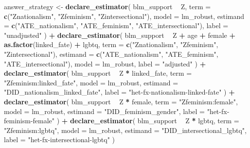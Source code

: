 \documentclass[
]{article}
\newenvironment{Shaded}{\begin{snugshade}}{\end{snugshade}}
\newcommand{\DataTypeTok}[1]{\textcolor[rgb]{0.13,0.29,0.53}{#1}}
\newcommand{\KeywordTok}[1]{\textcolor[rgb]{0.13,0.29,0.53}{\textbf{#1}}}
\newcommand{\NormalTok}[1]{#1}
\newcommand{\OperatorTok}[1]{\textcolor[rgb]{0.81,0.36,0.00}{\textbf{#1}}}
\newcommand{\StringTok}[1]{\textcolor[rgb]{0.31,0.60,0.02}{#1}}
\begin{document}
\begin{Shaded}
\begin{Highlighting}[]
\NormalTok{answer_strategy <-}
\StringTok{  }\KeywordTok{declare_estimator}\NormalTok{(}
\NormalTok{    blm_support }\OperatorTok{~}\StringTok{ }\NormalTok{Z,}
    \DataTypeTok{term =} \KeywordTok{c}\NormalTok{(}\StringTok{"Znationalism"}\NormalTok{, }\StringTok{"Zfeminism"}\NormalTok{, }\StringTok{"Zintersectional"}\NormalTok{),}
    \DataTypeTok{model =}\NormalTok{ lm_robust,}
    \DataTypeTok{estimand =} \KeywordTok{c}\NormalTok{(}\StringTok{"ATE_nationalism"}\NormalTok{, }\StringTok{"ATE_feminism"}\NormalTok{, }\StringTok{"ATE_intersectional"}\NormalTok{),}
    \DataTypeTok{label =} \StringTok{"unadjusted"}
\NormalTok{  ) }\OperatorTok{+}
\StringTok{  }\KeywordTok{declare_estimator}\NormalTok{(}
\NormalTok{    blm_support }\OperatorTok{~}\StringTok{ }\NormalTok{Z }\OperatorTok{+}\StringTok{ }\NormalTok{age }\OperatorTok{+}\StringTok{ }\NormalTok{female }\OperatorTok{+}\StringTok{ }\KeywordTok{as.factor}\NormalTok{(linked_fate) }\OperatorTok{+}\StringTok{ }\NormalTok{lgbtq,}
    \DataTypeTok{term =} \KeywordTok{c}\NormalTok{(}\StringTok{"Znationalism"}\NormalTok{, }\StringTok{"Zfeminism"}\NormalTok{, }\StringTok{"Zintersectional"}\NormalTok{),}
    \DataTypeTok{estimand =} \KeywordTok{c}\NormalTok{(}\StringTok{"ATE_nationalism"}\NormalTok{, }\StringTok{"ATE_feminism"}\NormalTok{, }\StringTok{"ATE_intersectional"}\NormalTok{),}
    \DataTypeTok{model =}\NormalTok{ lm_robust,}
    \DataTypeTok{label =} \StringTok{"adjusted"}
\NormalTok{  ) }\OperatorTok{+}
\StringTok{  }\KeywordTok{declare_estimator}\NormalTok{(}
\NormalTok{    blm_support }\OperatorTok{~}\StringTok{ }\NormalTok{Z }\OperatorTok{*}\StringTok{ }\NormalTok{linked_fate,}
    \DataTypeTok{term =} \StringTok{"Zfeminism:linked_fate"}\NormalTok{,}
    \DataTypeTok{model =}\NormalTok{ lm_robust,}
    \DataTypeTok{estimand =} \StringTok{"DID_nationalism_linked_fate"}\NormalTok{,}
    \DataTypeTok{label =} \StringTok{"het-fx-nationalism-linked-fate"}
\NormalTok{  ) }\OperatorTok{+}
\StringTok{  }\KeywordTok{declare_estimator}\NormalTok{(}
\NormalTok{    blm_support }\OperatorTok{~}\StringTok{ }\NormalTok{Z }\OperatorTok{*}\StringTok{ }\NormalTok{female,}
    \DataTypeTok{term =} \StringTok{"Zfeminism:female"}\NormalTok{,}
    \DataTypeTok{model =}\NormalTok{ lm_robust,}
    \DataTypeTok{estimand =} \StringTok{"DID_feminism_gender"}\NormalTok{,}
    \DataTypeTok{label =} \StringTok{"het-fx-feminism-female"}
\NormalTok{  ) }\OperatorTok{+}
\StringTok{  }\KeywordTok{declare_estimator}\NormalTok{(}
\NormalTok{    blm_support }\OperatorTok{~}\StringTok{ }\NormalTok{Z }\OperatorTok{*}\StringTok{ }\NormalTok{lgbtq,}
    \DataTypeTok{term =} \StringTok{"Zfeminism:lgbtq"}\NormalTok{,}
    \DataTypeTok{model =}\NormalTok{ lm_robust,}
    \DataTypeTok{estimand =} \StringTok{"DID_intersectional_lgbtq"}\NormalTok{,}
    \DataTypeTok{label =} \StringTok{"het-fx-intersectional-lgbtq"}
\NormalTok{  )}
\end{Highlighting}
\end{Shaded}
\end{document}

